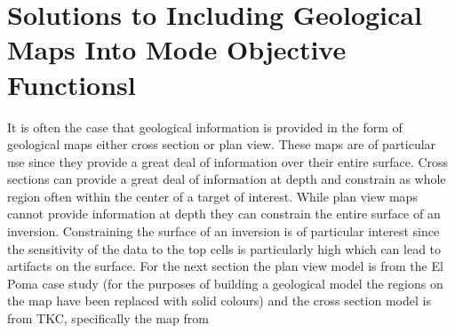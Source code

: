 
\chapter{Solutions to Including Geological Maps Into Mode Objective Functionsl }
\label{ch:GIFtools}
%
%
%
%
%
%
%
%	
%
%
%

It is often the case that geological information is provided in the form of geological maps either cross section or plan view. These maps are of particular use since they provide a great deal of information over their entire surface. Cross sections can provide a great deal of information at depth and constrain as whole region often within the center of a target of interest. While plan view maps cannot provide information at depth they can constrain the entire surface of an inversion.  Constraining the surface of an inversion is of particular interest since the sensitivity of the data to the top cells is particularly high which can lead to artifacts on the surface. For the next section the plan view model is from the El Poma case study (for the purposes of building a geological model the regions on the map have been replaced with solid colours) and the cross section model is from TKC, specifically the map from \citep{harder2006geology}

